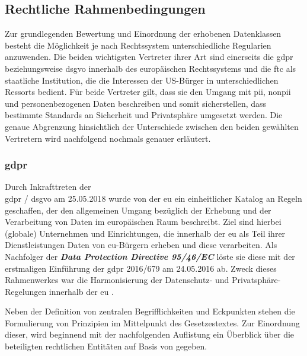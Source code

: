 \subsection{Rechtliche Rahmenbedingungen}
\label{sec:Grundlagen:ssec:Rechtliche Rahmenbedingungen}

Zur grundlegenden Bewertung und Einordnung der erhobenen Datenklassen besteht die Möglichkeit je nach Rechtssystem unterschiedliche Regularien anzuwenden. Die beiden wichtigsten Vertreter ihrer Art sind einerseits die \acl{gdpr} beziehungsweise \acl{dsgvo} innerhalb des europäischen Rechtssystems und die \acl{ftc} als staatliche Institution, die die Interessen der US-Bürger in unterschiedlichen Ressorts bedient. 
Für beide Vertreter gilt, dass sie den Umgang mit \ac{pii}, \ac{nonpii} und personenbezogenen Daten beschreiben und somit sicherstellen, dass bestimmte Standards an Sicherheit und Privatsphäre umgesetzt werden. Die genaue Abgrenzung hinsichtlich der Unterschiede zwischen den beiden gewählten Vertretern wird nachfolgend nochmals genauer erläutert.

\subsubsection{\acl{gdpr}}
\label{sec:Grundlagen:ssec:Rechtliche Rahmenbedingungen:sssec:GDPR}

Durch Inkrafttreten der \\ \ac{gdpr} / \ac{dsgvo} am 25.05.2018 wurde von der \acl{eu} ein einheitlicher Katalog an Regeln geschaffen, der den allgemeinen Umgang bezüglich der Erhebung und der Verarbeitung von Daten im europäischen Raum beschreibt. 
Ziel sind hierbei (globale) Unternehmen und Einrichtungen, die innerhalb der \acl{eu} als Teil ihrer Dienstleistungen Daten von \acs{eu}-Bürgern erheben und diese verarbeiten. Als Nachfolger der \textbf{\textit{Data Protection Directive 95/46/EC}} löste sie diese mit der erstmaligen Einführung der \ac{gdpr} 2016/679 am 24.05.2016 ab. 
Zweck dieses Rahmenwerkes war die Harmonisierung der Datenschutz- und Privatsphäre-Regelungen innerhalb der \acl{eu} \cite{Bastos2019}.

\noindent Neben der Definition von zentralen Begrifflichkeiten und Eckpunkten stehen die Formulierung von Prinzipien im Mittelpunkt des Gesetzestextes. Zur Einordnung dieser, wird beginnend mit der nachfolgenden Auflistung ein Überblick über die beteiligten rechtlichen Entitäten auf Basis von \cite{DSGVOArt4} gegeben.


